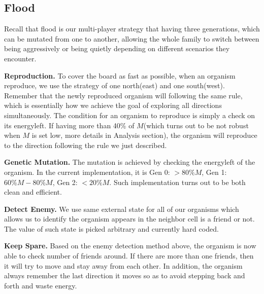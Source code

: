 \subsection{Flood}
Recall that flood is our multi-player strategy that having three generations, which can be mutated from one to another, allowing the whole family to switch between being aggressively or being quietly depending on different scenarios they encounter.

\textbf{Reproduction.} To cover the board as fast as possible, when an organism reproduce, we use the strategy of one north(east) and one south(west). 
Remember that the newly reproduced organism will following the same rule, 
which is essentially how we achieve the goal of exploring all directions simultaneously.
The condition for an organism to reproduce is simply a check on its energyleft.
If having more than 40\% of $M$(which turns out to be not robust when $M$ is set low, more details in Analysis section), the organism will reproduce to the direction following the rule we just described.

\textbf{Genetic Mutation.} The mutation is achieved by checking the energyleft of the organism. 
In the current implementation, it is Gen 0: $> 80\% M$, Gen 1: $60\%M - 80\%M$, Gen 2: $< 20\%M$.
Such implementation turns out to be both clean and efficient.

\textbf{Detect Enemy.} We use same external state for all of our organisms which allows us to identify the organism appears in the neighbor cell is a friend or not. The value of such state is picked arbitrary and currently hard coded.

\textbf{Keep Spare.} Based on the enemy detection method above, the organism is now able to check number of friends around. If there are more than one friends, then it will try to move and stay away from each other. In addition, the organism always remember the last direction it moves so as to avoid stepping back and forth and waste energy.
